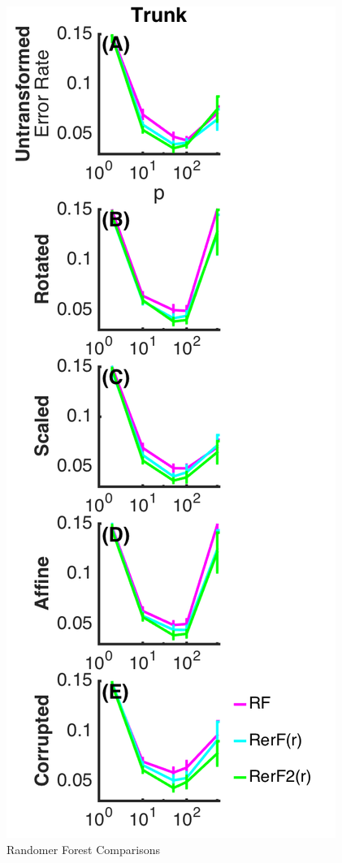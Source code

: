 \documentclass[simplex.tex]{subfiles}
\begin{document}
\begin{figure}[h!]
\begin{cframed}
\includegraphics[height=0.5\textheight]{./figs/RefF2.png}
\caption{
 Randomer Forest Comparisons
}
\label{fig:RefF1}
\end{cframed}
\end{figure}
\end{document}

